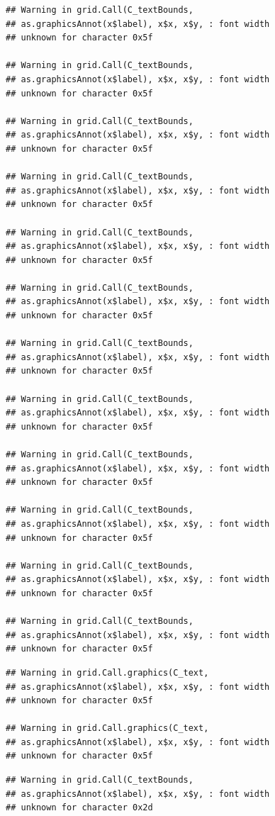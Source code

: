 \documentclass[
]{book}
\begin{document}
\begin{verbatim}
## Warning in grid.Call(C_textBounds,
## as.graphicsAnnot(x$label), x$x, x$y, : font width
## unknown for character 0x5f

## Warning in grid.Call(C_textBounds,
## as.graphicsAnnot(x$label), x$x, x$y, : font width
## unknown for character 0x5f

## Warning in grid.Call(C_textBounds,
## as.graphicsAnnot(x$label), x$x, x$y, : font width
## unknown for character 0x5f

## Warning in grid.Call(C_textBounds,
## as.graphicsAnnot(x$label), x$x, x$y, : font width
## unknown for character 0x5f

## Warning in grid.Call(C_textBounds,
## as.graphicsAnnot(x$label), x$x, x$y, : font width
## unknown for character 0x5f

## Warning in grid.Call(C_textBounds,
## as.graphicsAnnot(x$label), x$x, x$y, : font width
## unknown for character 0x5f

## Warning in grid.Call(C_textBounds,
## as.graphicsAnnot(x$label), x$x, x$y, : font width
## unknown for character 0x5f

## Warning in grid.Call(C_textBounds,
## as.graphicsAnnot(x$label), x$x, x$y, : font width
## unknown for character 0x5f

## Warning in grid.Call(C_textBounds,
## as.graphicsAnnot(x$label), x$x, x$y, : font width
## unknown for character 0x5f

## Warning in grid.Call(C_textBounds,
## as.graphicsAnnot(x$label), x$x, x$y, : font width
## unknown for character 0x5f

## Warning in grid.Call(C_textBounds,
## as.graphicsAnnot(x$label), x$x, x$y, : font width
## unknown for character 0x5f

## Warning in grid.Call(C_textBounds,
## as.graphicsAnnot(x$label), x$x, x$y, : font width
## unknown for character 0x5f
\end{verbatim}

\begin{verbatim}
## Warning in grid.Call.graphics(C_text,
## as.graphicsAnnot(x$label), x$x, x$y, : font width
## unknown for character 0x5f

## Warning in grid.Call.graphics(C_text,
## as.graphicsAnnot(x$label), x$x, x$y, : font width
## unknown for character 0x5f
\end{verbatim}

\begin{verbatim}
## Warning in grid.Call(C_textBounds,
## as.graphicsAnnot(x$label), x$x, x$y, : font width
## unknown for character 0x2d
\end{verbatim}
\end{document}

